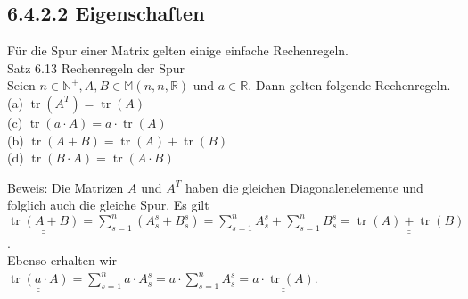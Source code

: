 \documentclass[10pt]{article}
\begin{document}
\subsection*{6.4.2.2 Eigenschaften}
Für die Spur einer Matrix gelten einige einfache Rechenregeln.\\
Satz 6.13 Rechenregeln der Spur\\
Seien $n \in \mathbb{N}^{+}, A, B \in \mathbb{M}(n, n, \mathbb{R})$ und $a \in \mathbb{R}$. Dann gelten folgende Rechenregeln.\\
(a) $\operatorname{tr}\left(A^{T}\right)=\operatorname{tr}(A)$\\
(c) $\operatorname{tr}(a \cdot A)=a \cdot \operatorname{tr}(A)$\\
(b) $\operatorname{tr}(A+B)=\operatorname{tr}(A)+\operatorname{tr}(B)$\\
(d) $\operatorname{tr}(B \cdot A)=\operatorname{tr}(A \cdot B)$

Beweis: Die Matrizen $A$ und $A^{T}$ haben die gleichen Diagonalenelemente und folglich auch die gleiche Spur. Es gilt\\
$\underline{\underline{\operatorname{tr}(A+B)}}=\sum_{s=1}^{n}\left(A_{s}^{s}+B_{s}^{s}\right)=\sum_{s=1}^{n} A_{s}^{s}+\sum_{s=1}^{n} B_{s}^{s}=\underline{\underline{\operatorname{tr}(A)+\operatorname{tr}(B)}}$.\\
Ebenso erhalten wir\\
$\underline{\underline{\operatorname{tr}(a \cdot A)}}=\sum_{s=1}^{n} a \cdot A_{s}^{s}=a \cdot \sum_{s=1}^{n} A_{s}^{s}=\underline{\underline{a \cdot \operatorname{tr}(A)}}$.
\end{document}
